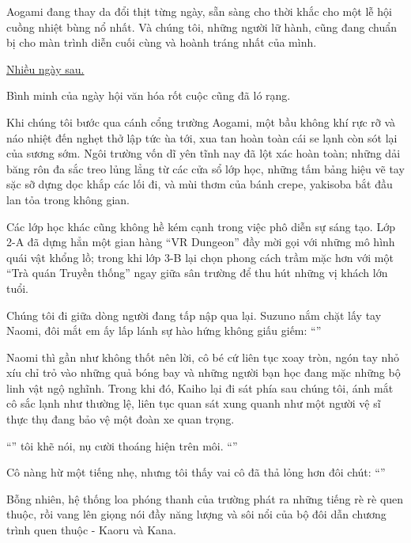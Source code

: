 \documentclass[../main.tex]{subfiles}
\begin{document}
Aogami đang thay da đổi thịt từng ngày, sẵn sàng cho thời khắc cho một lễ hội cuồng nhiệt bùng nổ nhất. Và chúng tôi, những người lữ hành, cũng đang chuẩn bị cho màn trình diễn cuối cùng và hoành tráng nhất của mình.

\begin{center}
  \uline{Nhiều ngày sau.}
\end{center}

Bình minh của ngày hội văn hóa rốt cuộc cũng đã ló rạng.

Khi chúng tôi bước qua cánh cổng trường Aogami, một bầu không khí rực rỡ và náo nhiệt đến nghẹt thở lập tức ùa tới, xua tan hoàn toàn cái se lạnh còn sót lại của sương sớm. Ngôi trường vốn dĩ yên tĩnh nay đã lột xác hoàn toàn; những dải băng rôn đa sắc treo lủng lẳng từ các cửa sổ lớp học, những tấm bảng hiệu vẽ tay sặc sỡ dựng dọc khắp các lối đi, và mùi thơm của bánh crepe, yakisoba bắt đầu lan tỏa trong không gian.

Các lớp học khác cũng không hề kém cạnh trong việc phô diễn sự sáng tạo. Lớp 2-A đã dựng hẳn một gian hàng ``VR Dungeon'' đầy mời gọi với những mô hình quái vật khổng lồ; trong khi lớp 3-B lại chọn phong cách trầm mặc hơn với một ``Trà quán Truyền thống'' ngay giữa sân trường để thu hút những vị khách lớn tuổi.

Chúng tôi đi giữa dòng người đang tấp nập qua lại. Suzuno nắm chặt lấy tay Naomi, đôi mắt em ấy lấp lánh sự hào hứng không giấu giếm: ``''

Naomi thì gần như không thốt nên lời, cô bé cứ liên tục xoay tròn, ngón tay nhỏ xíu chỉ trỏ vào những quả bóng bay và những người bạn học đang mặc những bộ linh vật ngộ nghĩnh. Trong khi đó, Kaiho lại đi sát phía sau chúng tôi, ánh mắt cô sắc lạnh như thường lệ, liên tục quan sát xung quanh như một người vệ sĩ thực thụ đang bảo vệ một đoàn xe quan trọng.

``'' tôi khẽ nói, nụ cười thoáng hiện trên môi. ``''

Cô nàng hừ một tiếng nhẹ, nhưng tôi thấy vai cô đã thả lỏng hơn đôi chút: ``''

Bỗng nhiên, hệ thống loa phóng thanh của trường phát ra những tiếng rè rè quen thuộc, rồi vang lên giọng nói đầy năng lượng và sôi nổi của bộ đôi dẫn chương trình quen thuộc - Kaoru và Kana.
\end{document}
